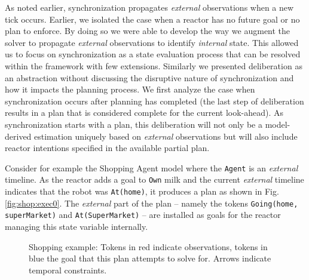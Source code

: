 
As noted earlier, synchronization propagates {\em
  external} observations when a new tick occurs. Earlier, we isolated
the case when a reactor has no future goal or no plan to enforce. By
doing so we were able to develop the way we augment the \eu solver to
propagate {\em external} observations to identify {\em
  internal} state. This allowed us to focus on synchronization as a
state evaluation process that can be resolved within the \eu framework
with few extensions. Similarly we presented deliberation as an
abstraction without discussing the disruptive nature of
synchronization and how it impacts the planning process. We first
analyze the case when synchronization occurs after planning has
completed (\ie the last step of deliberation results in a plan that is
considered complete for the current look-ahead). As synchronization
starts with a plan, this deliberation will not only be a model-derived
estimation uniquely based on {\em external} observations but will also
include reactor intentions specified in the available partial plan.

Consider for example the Shopping Agent model where the \texttt{Agent}
is an {\em external} timeline. As the reactor adds a goal to
\texttt{Own} milk and the current {\em external} timeline indicates
that the robot was \texttt{At(home)}, it produces a plan as shown in
Fig. \ref{fig:shop:exec0}. The {\em external} part of the plan --
namely the tokens \texttt{Going(home, superMarket)} and
\texttt{At(SuperMarket)} -- are installed as goals for the reactor
managing this state variable internally.

\begin{figure}[!htb]
  \centering
    \caption{\small Shopping example: Tokens in red indicate
      observations, tokens in blue the goal that this plan attempts to
      solve for. Arrows indicate temporal constraints. }
  \label{fig:shop:exec}
\end{figure}

